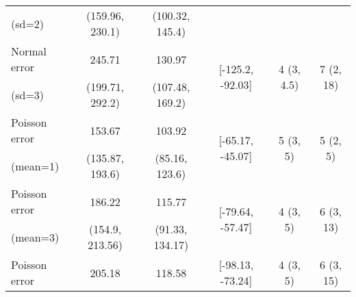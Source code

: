 \begin{table}[hbtp]
{\begin{tabular}{@{}lccccc@{}}
(sd=2)               & (159.96, 230.1)  & (100.32, 145.4) &                                                                           &                                                                            &                                                                             \\
Normal error         & 245.71           & 130.97          & \multirow{2}{*}{{[}-125.2, -92.03{]}}                                     & \multirow{2}{*}{4 (3, 4.5)}                                                & \multirow{2}{*}{7 (2, 18)}                                                  \\
(sd=3)               & (199.71, 292.2)  & (107.48, 169.2) &                                                                           &                                                                            &                                                                             \\
Poisson error        & 153.67           & 103.92          & \multirow{2}{*}{{[}-65.17, -45.07{]}}                                     & \multirow{2}{*}{5 (3, 5)}                                                  & \multirow{2}{*}{5 (2, 5)}                                                   \\
(mean=1)             & (135.87, 193.6)  & (85.16, 123.6)  &                                                                           &                                                                            &                                                                             \\
Poisson error        & 186.22           & 115.77          & \multirow{2}{*}{{[}-79.64, -57.47{]}}                                     & \multirow{2}{*}{4 (3, 5)}                                                  & \multirow{2}{*}{6 (3, 13)}                                                  \\
(mean=3)             & (154.9, 213.56)  & (91.33, 134.17) &                                                                           &                                                                            &                                                                             \\
Poisson error        & 205.18           & 118.58          & \multirow{2}{*}{{[}-98.13, -73.24{]}}                                     & \multirow{2}{*}{4 (3, 5)}                                                  & \multirow{2}{*}{6 (3, 15)}                                                  \\

\end{tabular}}
\end{table}
